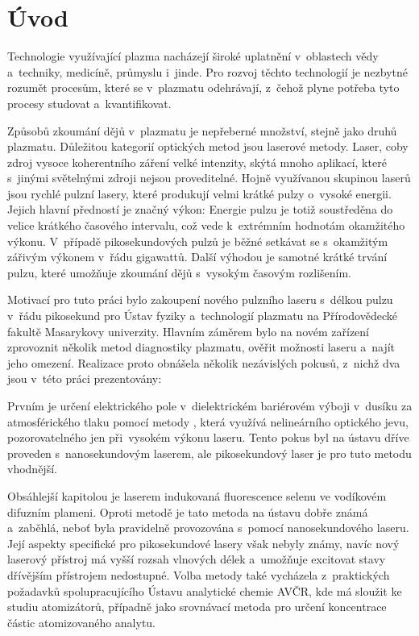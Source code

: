 \chapter*{Úvod}
Technologie využívající plazma nacházejí široké uplatnění v~oblastech
vědy a~techniky, medicíně, průmyslu i~jinde.
Pro rozvoj těchto technologií je nezbytné rozumět procesům,
které se v~plazmatu odehrávají, z~čehož plyne potřeba tyto procesy
studovat a~kvantifikovat.

Způsobů zkoumání dějů v~plazmatu je nepřeberné množství,
stejně jako druhů plazmatu.
Důležitou kategorií optických metod jsou laserové metody.
Laser, coby zdroj vysoce koherentního záření velké intenzity,
skýtá mnoho aplikací, které s~jinými světelnými zdroji nejsou proveditelné.
Hojně využívanou skupinou laserů jsou rychlé pulzní lasery,
které produkují velmi krátké pulzy o~vysoké energii.
Jejich hlavní předností je značný výkon:
Energie pulzu je totiž soustředěna do velice krátkého časového intervalu,
což vede k~extrémním hodnotám okamžitého výkonu.
V~případě pikosekundových pulzů je běžné setkávat se s~okamžitým zářivým
výkonem v~řádu gigawattů.
Další výhodou je samotné krátké trvání pulzu, které umožňuje zkoumání
dějů s~vysokým časovým rozlišením.

Motivací pro tuto práci bylo zakoupení nového pulzního laseru
s~délkou pulzu v~řádu pikosekund
pro Ústav fyziky a~technologií plazmatu na Přírodovědecké fakultě
Masarykovy univerzity.
Hlavním záměrem bylo na novém zařízení zprovoznit několik metod
diagnostiky plazmatu, ověřit možnosti laseru a~najít jeho omezení.
Realizace proto obnášela několik nezávislých pokusů,
z~nichž dva jsou v~této práci prezentovány:

Prvním je určení elektrického pole v~dielektrickém bariérovém výboji
v~dusíku za atmosférického tlaku pomocí metody \EFISH{},
která využívá nelineárního optického jevu,
pozorovatelného jen při~vysokém výkonu laseru.
Tento pokus byl na ústavu dříve proveden s~nanosekundovým laserem,
ale pikosekundový laser je pro tuto metodu vhodnější.

Obsáhlejší kapitolou je laserem indukovaná fluorescence selenu
ve vodíkovém difuzním plameni.
Oproti metodě \EFISH{} je tato metoda na ústavu dobře známá a~zaběhlá,
neboť byla pravidelně provozována s~pomocí nanosekundového laseru.
Její aspekty specifické pro pikosekundové lasery však nebyly známy,
navíc nový laserový přístroj má vyšší rozsah vlnových délek
a~umožňuje excitovat stavy dřívějším přístrojem nedostupné.
Volba metody také vycházela z~praktických požadavků spolupracujícího
Ústavu analytické chemie AVČR, kde má sloužit ke studiu atomizátorů,
případně jako srovnávací
metoda pro určení koncentrace částic atomizovaného analytu.

